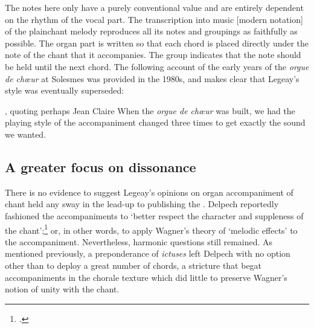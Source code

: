   {\cite[4:14]{Melodieschantgregorien1892}}
{The notes here only have a purely conventional value and are entirely dependent on the rhythm of the vocal part. The transcription into music [modern notation] of the plainchant melody reproduces all its notes and groupings as faithfully as possible. The organ part is written so that each chord is placed directly under the note of the chant that it accompanies. The group \legeayGroup{} indicates that the note should be held until the next chord.}
\noindent
The following account of the early years of the \emph{orgue de chœur} at Solesmes was provided in the 1980s, and makes clear that Legeay's style was eventually superseded:

  {\cite[401]{Pinguetecolesmusiquedivine1987}, quoting perhaps Jean Claire}
{When the \emph{orgue de chœur} was built, we had the playing style of the \mbox{accompaniment} changed three times to get exactly the sound we wanted.}

\subsection{A greater focus on dissonance}
There is no evidence to suggest Legeay's opinions on organ accompaniment of chant held any sway in the lead-up to publishing the \ldo{}.
Delpech reportedly fashioned the accompaniments to `better respect the character and suppleness of the chant';\footcite[p.~v]{LivreOrgueChants1898} or, in other words, to apply Wagner's theory of `melodic effects' to the accompaniment.
Nevertheless, harmonic questions still remained.
As mentioned previously, a preponderance of \emph{ictuses} left Delpech with no option other than to deploy a great number of chords, a stricture that begat accompaniments in the chorale texture which did little to preserve Wagner's notion of unity with the chant.
\nowidow[2]

